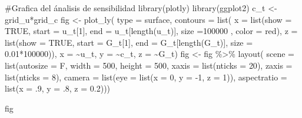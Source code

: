 \documentclass[
  us-letterpaper,
]{scrreprt}
\newenvironment{Shaded}{\begin{snugshade}}{\end{snugshade}}
\newcommand{\AttributeTok}[1]{\textcolor[rgb]{0.40,0.45,0.13}{#1}}
\newcommand{\CommentTok}[1]{\textcolor[rgb]{0.37,0.37,0.37}{#1}}
\newcommand{\ConstantTok}[1]{\textcolor[rgb]{0.56,0.35,0.01}{#1}}
\newcommand{\DecValTok}[1]{\textcolor[rgb]{0.68,0.00,0.00}{#1}}
\newcommand{\FloatTok}[1]{\textcolor[rgb]{0.68,0.00,0.00}{#1}}
\newcommand{\FunctionTok}[1]{\textcolor[rgb]{0.28,0.35,0.67}{#1}}
\newcommand{\NormalTok}[1]{\textcolor[rgb]{0.00,0.23,0.31}{#1}}
\newcommand{\OtherTok}[1]{\textcolor[rgb]{0.00,0.23,0.31}{#1}}
\newcommand{\SpecialCharTok}[1]{\textcolor[rgb]{0.37,0.37,0.37}{#1}}
\newcommand{\StringTok}[1]{\textcolor[rgb]{0.13,0.47,0.30}{#1}}
\theoremstyle{plain}
\theoremstyle{plain}
\theoremstyle{definition}
\theoremstyle{remark}
\begin{document}
\begin{Shaded}
\begin{Highlighting}[]
\CommentTok{\#Grafica del ánalisis de sensibilidad}
\FunctionTok{library}\NormalTok{(plotly)}
\FunctionTok{library}\NormalTok{(ggplot2)}
\NormalTok{c\_t }\OtherTok{\textless{}{-}}\NormalTok{ grid\_u}\SpecialCharTok{*}\NormalTok{grid\_c}
\NormalTok{fig }\OtherTok{\textless{}{-}} \FunctionTok{plot\_ly}\NormalTok{(}
  \AttributeTok{type =} \StringTok{\textquotesingle{}surface\textquotesingle{}}\NormalTok{,}
  \AttributeTok{contours =} \FunctionTok{list}\NormalTok{(}
    \AttributeTok{x =} \FunctionTok{list}\NormalTok{(}\AttributeTok{show =} \ConstantTok{TRUE}\NormalTok{, }\AttributeTok{start =}\NormalTok{ u\_t[}\DecValTok{1}\NormalTok{], }
             \AttributeTok{end =}\NormalTok{ u\_t[}\FunctionTok{length}\NormalTok{(u\_t)], }
             \AttributeTok{size =}\DecValTok{100000}\NormalTok{ , }\AttributeTok{color =} \StringTok{\textquotesingle{}red\textquotesingle{}}\NormalTok{),}
    \AttributeTok{z =} \FunctionTok{list}\NormalTok{(}\AttributeTok{show =} \ConstantTok{TRUE}\NormalTok{, }\AttributeTok{start =}\NormalTok{ G\_t[}\DecValTok{1}\NormalTok{], }
             \AttributeTok{end =}\NormalTok{ G\_t[}\FunctionTok{length}\NormalTok{(G\_t)], }
             \AttributeTok{size =} \FloatTok{0.01}\SpecialCharTok{*}\DecValTok{100000}\NormalTok{)),}
  \AttributeTok{x =} \SpecialCharTok{\textasciitilde{}}\NormalTok{u\_t,}
  \AttributeTok{y =} \SpecialCharTok{\textasciitilde{}}\NormalTok{c\_t,}
  \AttributeTok{z =} \SpecialCharTok{\textasciitilde{}}\NormalTok{G\_t)}
\NormalTok{fig }\OtherTok{\textless{}{-}}\NormalTok{ fig }\SpecialCharTok{\%\textgreater{}\%} \FunctionTok{layout}\NormalTok{(}
  \AttributeTok{scene =} \FunctionTok{list}\NormalTok{(}\AttributeTok{autosize =}\NormalTok{ F, }\AttributeTok{width =} \DecValTok{500}\NormalTok{, }\AttributeTok{height =} \DecValTok{500}\NormalTok{,}
    \AttributeTok{xaxis =} \FunctionTok{list}\NormalTok{(}\AttributeTok{nticks =} \DecValTok{20}\NormalTok{),}
    \AttributeTok{zaxis =} \FunctionTok{list}\NormalTok{(}\AttributeTok{nticks =} \DecValTok{8}\NormalTok{),}
    \AttributeTok{camera =} \FunctionTok{list}\NormalTok{(}\AttributeTok{eye =} \FunctionTok{list}\NormalTok{(}\AttributeTok{x =} \DecValTok{0}\NormalTok{, }
                             \AttributeTok{y =} \SpecialCharTok{{-}}\DecValTok{1}\NormalTok{, }\AttributeTok{z =} \DecValTok{1}\NormalTok{)),}
    \AttributeTok{aspectratio =} \FunctionTok{list}\NormalTok{(}\AttributeTok{x =}\NormalTok{ .}\DecValTok{9}\NormalTok{, }\AttributeTok{y =}\NormalTok{ .}\DecValTok{8}\NormalTok{, }\AttributeTok{z =} \FloatTok{0.2}\NormalTok{)))}

\NormalTok{fig}
\end{Highlighting}
\end{Shaded}
\end{document}
